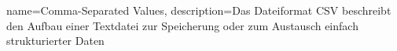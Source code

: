 

 {
	name={Comma-Separated Values},
	description={Das Dateiformat CSV beschreibt den Aufbau einer Textdatei zur Speicherung oder zum Austausch einfach strukturierter Daten}
}